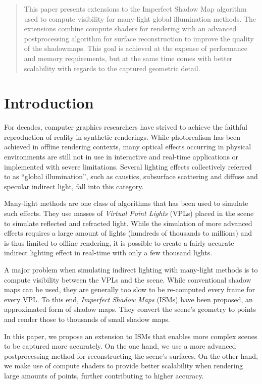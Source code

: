

\begin{abstract}
This paper presents extensions to the Imperfect Shadow Map algorithm used to compute visibility for many-light global illumination methods. The extensions combine compute shaders for rendering with an advanced postprocessing algorithm for surface reconstruction to improve the quality of the shadowmaps. This goal is achieved at the expense of performance and memory requirements, but at the same time comes with better scalability with regards to the captured geometric detail.
\end{abstract}



\section{Introduction}
For decades, computer graphics researchers have strived to achieve the faithful reproduction of reality in synthetic renderings. While photorealism has been achieved in offline rendering contexts, many optical effects occurring in physical environments are still not in use in interactive and real-time applications or implemented with severe limitations. Several lighting effects collectively referred to as ``global illumination'', such as caustics, subsurface scattering and diffuse and specular indirect light, fall into this category.

Many-light methods are one class of algorithms that has been used to simulate such effects. They use masses of \textit{Virtual Point Lights} (VPLs) placed in the scene to simulate reflected and refracted light. While the simulation of more advanced effects requires a large amount of lights (hundreds of thousands to millions) and is thus limited to offline rendering, it is possible to create a fairly accurate indirect lighting effect in real-time with only a few thousand lights.

A major problem when simulating indirect lighting with many-light methods is to compute visibility between the VPLs and the scene. While conventional shadow maps can be used, they are generally too slow to be re-computed every frame for every VPL. To this end, \textit{Imperfect Shadow Maps} (ISMs) have been proposed, an approximated form of shadow maps. They convert the scene's geometry to points and render those to thousands of small shadow maps.

In this paper, we propose an extension to ISMs that enables more complex scenes to be captured more accurately. On the one hand, we use a more advanced postprocessing method for reconstructing the scene's surfaces. On the other hand, we make use of compute shaders to provide better scalability when rendering large amounts of points, further contributing to higher accuracy.




